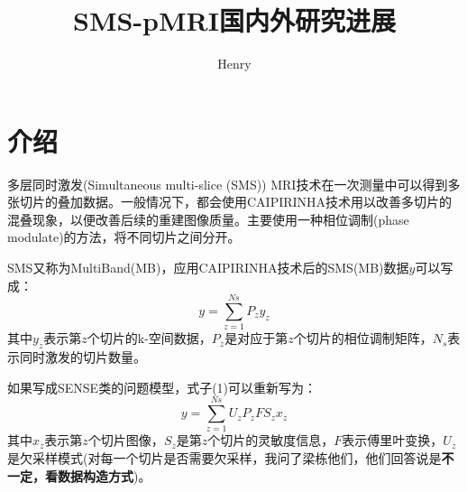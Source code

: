 \documentclass[UTF8]{article}
\begin{document}
\author{Henry}
\title{SMS-pMRI国内外研究进展}
\maketitle
\section{介绍}
\par 多层同时激发(Simultaneous multi-slice (SMS)) MRI技术在一次测量中可以得到多张切片的叠加数据。一般情况下，都会使用CAIPIRINHA\cite{breuer2005controlled}技术用以改善多切片的混叠现象，以便改善后续的重建图像质量。主要使用一种相位调制(phase modulate)的方法，将不同切片之间分开。
\par SMS又称为MultiBand(MB)，应用CAIPIRINHA技术后的SMS(MB)数据$y$可以写成：
\
\begin{equation}
	y = \sum_{z=1}^{Ns}P_z y_z
\end{equation}
其中$y_z$表示第$z$个切片的k-空间数据，$P_z$是对应于第$z$个切片的相位调制矩阵，$N_s$表示同时激发的切片数量。

\par 如果写成SENSE类的问题模型，式子(1)可以重新写为：
\begin{equation}
	y=\sum_{z=1}^{Ns}U_zP_z F S_z x_z
\end{equation}
其中$x_z$表示第$z$个切片图像，$S_z$是第$z$个切片的灵敏度信息，$F$表示傅里叶变换，$U_z$是欠采样模式(对每一个切片是否需要欠采样，我问了梁栋他们，他们回答说是\textbf{不一定，看数据构造方式})。
\end{document}
